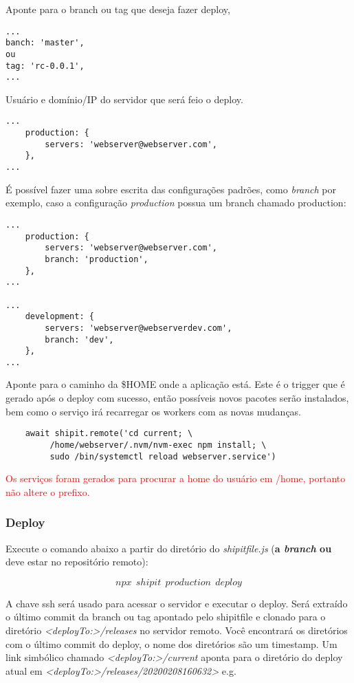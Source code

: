 Aponte para o branch ou tag que deseja fazer deploy,
\begin{verbatim}
...
banch: 'master',
ou
tag: 'rc-0.0.1',
...
\end{verbatim}

Usuário e domínio/IP do servidor que será feio o deploy.
\begin{verbatim}
...
    production: {
        servers: 'webserver@webserver.com',
    },
...
\end{verbatim}

É possível fazer uma sobre escrita das configurações padrões,
como \emph{branch} por exemplo, caso a configuração \emph{production}
possua um branch chamado production:
\begin{verbatim}
...
    production: {
        servers: 'webserver@webserver.com',
        branch: 'production',
    },
...

...
    development: {
        servers: 'webserver@webserverdev.com',
        branch: 'dev',
    },
...
\end{verbatim}

Aponte para o caminho da \$HOME onde a aplicação está. Este é o
trigger que é gerado após o deploy com sucesso, então possíveis novos
pacotes serão instalados, bem como o serviço irá recarregar os workers
com as novas mudanças.

\begin{verbatim}
    await shipit.remote('cd current; \
         /home/webserver/.nvm/nvm-exec npm install; \
         sudo /bin/systemctl reload webserver.service')
\end{verbatim}

\textcolor{red}{Os serviços foram gerados para procurar a home do
  usuário em /home, portanto não altere o prefixo.}

\subsubsection{Deploy}
Execute o comando abaixo a partir do diretório do
\emph{shipitfile.js} (\textbf{a \emph{branch} ou } deve
estar no repositório remoto):

$$npx\ \ shipit\ \ production\ \ deploy$$

A chave ssh será usado para acessar o servidor e executar o
deploy. Será extraído o último commit da branch ou tag apontado pelo
shipitfile e clonado para o diretório
\textit{<\textit{deployTo:}>/releases} no servidor remoto. Você
encontrará os diretórios com o último commit do deploy, o nome dos
diretórios são um timestamp. Um link simbólico chamado
\textit{<deployTo:>/current} aponta para o diretório do deploy atual
em \textit{<deployTo:>/releases/20200208160632>} e.g. 


